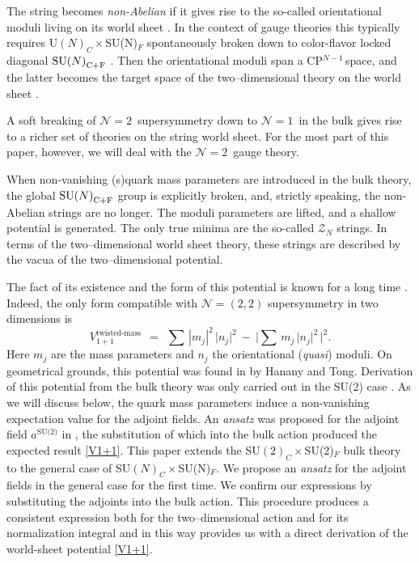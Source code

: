 \documentclass[12pt]{article}
\def\beq{\begin{equation}}
\def\eeq{\end{equation}}
\newcommand{\nonen}{${\mathcal N}=1$}
\newcommand{\ntwon}{${\mathcal N}=2$}
\newcommand{\ntwot}{${\mathcal N}= \left(2,2\right) $ }
\newcommand{\mc}[1]{\mathcal{#1}}
\def\cfl {$\text{SU($N$)}_{\rm C+F}$ }
\newcommand{\cpn}{CP$^{N-1}$\,}
\newcommand{\ansatz}{{\it ansatz} }
\begin{document}
	The string becomes {\it non-Abelian} if it gives rise to the so-called orientational moduli living on
	its world sheet \cite{HT1,ABEKY,SYmon,HT2}. In the context of gauge theories this typically requires U$(N)_C\times$SU(N)$_F$
	spontaneously broken down to color-flavor locked  diagonal $\!$\cfl.
	Then the orientational moduli  span a \cpn space, and 
	the latter becomes the target space of the two--dimensional theory on the world sheet \cite{SYrev}.

	A soft breaking of \ntwon\, supersymmetry down to
	\nonen\, in the bulk gives rise to a richer  set of theories on the string world sheet.
	For the most part of this paper, however, we will deal with the \ntwon\, gauge theory.

	When non-vanishing (s)quark mass parameters are introduced in  the bulk theory, 
	the global \cfl group is explicitly broken, and, strictly speaking,
	the non-Abelian strings are no longer.
	The moduli parameters are lifted, and a shallow potential is generated. The only true minima  are the so-called $ \mc{Z}_N $ strings.
	In terms of the two--dimensional world sheet theory, these strings are described by
	the vacua of the two--dimensional potential.

	The fact of its existence and the form of this potential is known for a long time 
\cite{Dorey:1998yh,Shifman:2006bs}.
	Indeed, the only form compatible with \ntwot supersymmetry in two dimensions is
\beq
\label{V1+1}
	V_{1+1}^\text{twisted-mass}    ~~=~~    \sum\, | m_j |^2\, \big| n_j \big|^2   ~-~  \Big| \sum\, m_j\, \big| n_j \big|^2 \,\Big|^2.
\eeq
	Here $ m_j $ are the mass parameters and $ n_j $ the orientational ({\it quasi}) moduli.
	On geometrical grounds, this potential was found in \cite{HT2} by Hanany and Tong. 
	Derivation of this potential from the bulk theory was only carried out in the SU(2) case \cite{SYmon}.
	As we will discuss below, the quark mass parameters induce a non-vanishing expectation value for the adjoint fields.
	An \ansatz was proposed for the adjoint field $ a^\text{SU(2)} $ in \cite{SYmon},
	the substitution of which into the bulk action produced the expected result \eqref{V1+1}.
	This paper extends the SU$(2)_C\times$SU(2)$_F$ bulk theory to the general case of SU$(N)_C\times$SU(N)$_F$.
	We propose an \ansatz for the adjoint fields in the general case  for the first time.
	We confirm our expressions by substituting the adjoints into the bulk action. 
	This procedure produces a consistent expression both for the two--dimensional action and for its normalization integral
	and in this way provides us with a direct
	derivation of the world-sheet potential \eqref{V1+1}.
\end{document}
